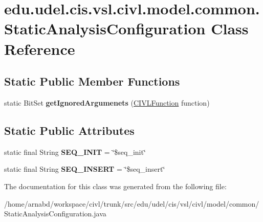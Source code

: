 \hypertarget{classedu_1_1udel_1_1cis_1_1vsl_1_1civl_1_1model_1_1common_1_1StaticAnalysisConfiguration}{}\section{edu.\+udel.\+cis.\+vsl.\+civl.\+model.\+common.\+Static\+Analysis\+Configuration Class Reference}
\label{classedu_1_1udel_1_1cis_1_1vsl_1_1civl_1_1model_1_1common_1_1StaticAnalysisConfiguration}
\subsection*{Static Public Member Functions}
\begin{DoxyCompactItemize}
\item 
\hypertarget{classedu_1_1udel_1_1cis_1_1vsl_1_1civl_1_1model_1_1common_1_1StaticAnalysisConfiguration_af702b555731ebd539f9b662190a46b82}{}static Bit\+Set {\bfseries get\+Ignored\+Argumenets} (\hyperlink{interfaceedu_1_1udel_1_1cis_1_1vsl_1_1civl_1_1model_1_1IF_1_1CIVLFunction}{C\+I\+V\+L\+Function} function)\label{classedu_1_1udel_1_1cis_1_1vsl_1_1civl_1_1model_1_1common_1_1StaticAnalysisConfiguration_af702b555731ebd539f9b662190a46b82}

\end{DoxyCompactItemize}
\subsection*{Static Public Attributes}
\begin{DoxyCompactItemize}
\item 
\hypertarget{classedu_1_1udel_1_1cis_1_1vsl_1_1civl_1_1model_1_1common_1_1StaticAnalysisConfiguration_a9a3ac6f908681a53d403a014ba4960a5}{}static final String {\bfseries S\+E\+Q\+\_\+\+I\+N\+I\+T} = \char`\"{}\$seq\+\_\+init\char`\"{}\label{classedu_1_1udel_1_1cis_1_1vsl_1_1civl_1_1model_1_1common_1_1StaticAnalysisConfiguration_a9a3ac6f908681a53d403a014ba4960a5}

\item 
\hypertarget{classedu_1_1udel_1_1cis_1_1vsl_1_1civl_1_1model_1_1common_1_1StaticAnalysisConfiguration_a180c41770438e5c3b95334b9bbee15f0}{}static final String {\bfseries S\+E\+Q\+\_\+\+I\+N\+S\+E\+R\+T} = \char`\"{}\$seq\+\_\+insert\char`\"{}\label{classedu_1_1udel_1_1cis_1_1vsl_1_1civl_1_1model_1_1common_1_1StaticAnalysisConfiguration_a180c41770438e5c3b95334b9bbee15f0}

\end{DoxyCompactItemize}


The documentation for this class was generated from the following file\+:\begin{DoxyCompactItemize}
\item 
/home/arnabd/workspace/civl/trunk/src/edu/udel/cis/vsl/civl/model/common/Static\+Analysis\+Configuration.\+java\end{DoxyCompactItemize}
